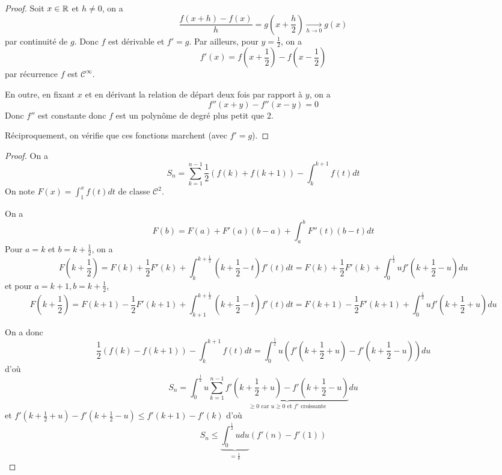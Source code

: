 \begin{proof}
	Soit $x\in\mathbb{R}$ et $h\neq0$, on a 
	\begin{equation}\frac{f(x+h)-f(x)}{h}=g(x+\frac{h}{2})\xrightarrow[h\to0]{}g(x)\end{equation}
	par continuité de $g$. Donc $f$ est dérivable et $f'=g$. Par ailleurs, pour $y=\frac{1}{2}$, on a 
	\begin{equation}f'(x)=f(x+\frac{1}{2})-f(x-\frac{1}{2})\end{equation}
	par récurrence $f$ est $\mathcal{C}^{\infty}$.

	En outre, en fixant $x$ et en dérivant la relation de départ deux fois par rapport à $y$, on a 
	\begin{equation}f''(x+y)-f''(x-y)=0\end{equation}
	Donc $f''$ est constante donc $f$ est un polynôme de degré plus petit que 2.

	Réciproquement, on vérifie que ces fonctions marchent (avec $f'=g$).
\end{proof}

\begin{proof}
	On a 
	\begin{equation}S_{n}=\sum_{k=1}^{n-1}\frac{1}{2}(f(k)+f(k+1))-\int_{k}^{k+1}f(t)dt\end{equation}
	On note $F(x)=\int_{1}^{x}f(t)dt$ de classe $\mathcal{C}^{2}$.

	On a
	\begin{equation}F(b)=F(a)+F'(a)(b-a)+\int_{a}^{b}F''(t)(b-t)dt\end{equation}
	Pour $a=k$ et $b=k+\frac{1}{2}$, on a 
	\begin{equation}F(k+\frac{1}{2})=F(k)+\frac{1}{2}F'(k)+\int_{k}^{k+\frac{1}{2}}(k+\frac{1}{2}-t)f'(t)dt=F(k)+\frac{1}{2}F'(k)+\int_{0}^{\frac{1}{2}}uf'(k+\frac{1}{2}-u)du\end{equation}
	et pour $a=k+1,b=k+\frac{1}{2}$,
	\begin{equation}F(k+\frac{1}{2})=F(k+1)-\frac{1}{2}F'(k+1)+\int_{k+1}^{k+\frac{1}{2}}(k+\frac{1}{2}-t)f'(t)dt=F(k+1)-\frac{1}{2}F'(k+1)+\int_{0}^{\frac{1}{2}}uf'(k+\frac{1}{2}+u)du\end{equation}

	On a donc
	\begin{equation}\frac{1}{2}(f(k)-f(k+1))-\int_{k}^{k+1}f(t)dt=\int_{0}^{\frac{1}{2}}u(f'(k+\frac{1}{2}+u)-f'(k+\frac{1}{2}-u))du\end{equation}
	d'où
	\begin{equation}S_{n}=\int_{0}^{\frac{1}{2}}u\sum_{k=1}^{n-1}\underbrace{f'(k+\frac{1}{2}+u)-f'(k+\frac{1}{2}-u)}_{\geqslant0\text{ car }u\geqslant0\text{ et }f'\text{ croissante}}du\end{equation}
	et 
	$f'(k+\frac{1}{2}+u)-f'(k+\frac{1}{2}-u)\leqslant f'(k+1)-f'(k)$ d'où 
	\begin{equation}S_{n}\leqslant\underbrace{\int_{0}^{\frac{1}{2}}udu}_{=\frac{1}{8}}(f'(n)-f'(1))\end{equation}
\end{proof}

